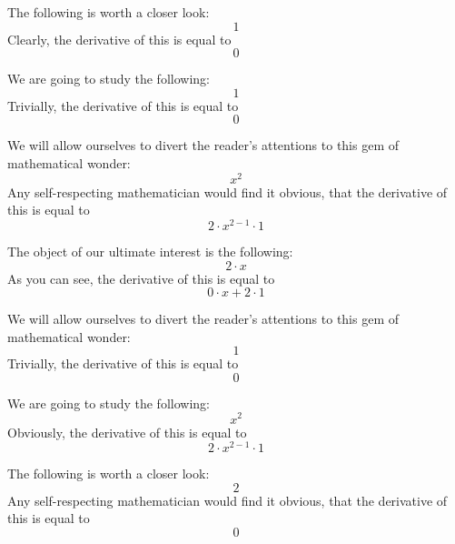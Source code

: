 \documentclass{article}
\begin{document}
The following is worth a closer look:
\begin{equation}
1 
\end{equation}
Clearly, the derivative of this is equal to
\begin{equation}
0 
\end{equation}

We are going to study the following:
\begin{equation}
1 
\end{equation}
Trivially, the derivative of this is equal to
\begin{equation}
0 
\end{equation}

We will allow ourselves to divert the reader's attentions to this gem of mathematical wonder:
\begin{equation}
x ^{2 } 
\end{equation}
Any self-respecting mathematician would find it obvious, that the derivative of this is equal to
\begin{equation}
2 \cdot x ^{2 - 1 } \cdot 1 
\end{equation}

The object of our ultimate interest is the following:
\begin{equation}
2 \cdot x 
\end{equation}
As you can see, the derivative of this is equal to
\begin{equation}
0 \cdot x + 2 \cdot 1 
\end{equation}

We will allow ourselves to divert the reader's attentions to this gem of mathematical wonder:
\begin{equation}
1 
\end{equation}
Trivially, the derivative of this is equal to
\begin{equation}
0 
\end{equation}

We are going to study the following:
\begin{equation}
x ^{2 } 
\end{equation}
Obviously, the derivative of this is equal to
\begin{equation}
2 \cdot x ^{2 - 1 } \cdot 1 
\end{equation}

The following is worth a closer look:
\begin{equation}
2 
\end{equation}
Any self-respecting mathematician would find it obvious, that the derivative of this is equal to
\begin{equation}
0 
\end{equation}
\end{document}

